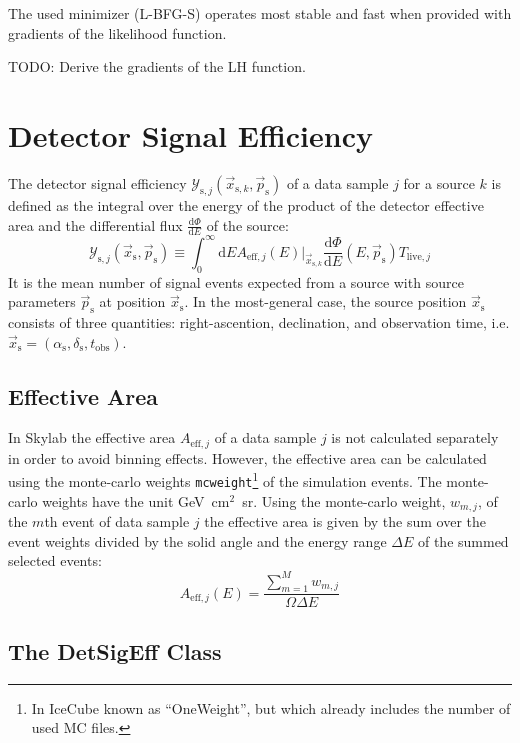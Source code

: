 \documentclass{article}
\newcommand{\code}[1]{\texttt{#1}}
\newcommand{\ps}{\vec{p}_{\mathrm{s}}}
\newcommand{\xs}{\vec{x}_{\mathrm{s}}}
\newcommand{\xsk}{\vec{x}_{\mathrm{s},k}}
\begin{document}
The used minimizer (L-BFG-S) operates most stable and fast when provided with
gradients of the likelihood function.

TODO: Derive the gradients of the LH function.

\section{Detector Signal Efficiency}

The detector signal efficiency $\mathcal{Y}_{\mathrm{s},j}(\vec{x}_{\mathrm{s},k},\ps)$
of a data sample $j$ for a source $k$ is defined as the integral over the energy
of the product of the detector effective area and the differential flux
$\frac{\mathrm{d}\Phi}{\mathrm{d}E}$ of the source:
\begin{equation}
 \mathcal{Y}_{\mathrm{s},j}(\xs,\ps) \equiv \int_0^\infty \mathrm{d}E A_{\mathrm{eff},j}(E)|_{\xsk} \frac{\mathrm{d}\Phi}{\mathrm{d}E}(E,\ps) T_{\mathrm{live},j}
\label{eq:Ysj}
\end{equation}
It is the mean number of signal events expected from a source with source
parameters $\ps$ at position $\xs$. In the most-general case, the source position $\xs$
consists of three quantities: right-ascention, declination, and observation time,
i.e. $\xs = (\alpha_{\mathrm{s}},\delta_{\mathrm{s}},t_{\mathrm{obs}})$.

\subsection{Effective Area}

In Skylab the effective area $A_{\mathrm{eff},j}$ of a data sample $j$ is not
calculated separately in order to avoid binning effects. However, the effective
area can be calculated using the monte-carlo weights \code{mcweight}\footnote{In IceCube
known as ``OneWeight'', but which already includes the number of used MC files.}
of the simulation events.
The monte-carlo weights have the unit GeV~cm$^2$~sr.
Using the monte-carlo weight, $w_{m,j}$, of the $m$th event of data sample $j$
the effective area is given by the sum over the event weights divided by the
solid angle and the energy range $\Delta E$ of the summed selected events:
\begin{equation}
 A_{\mathrm{eff},j}(E) = \frac{\sum_{m=1}^{M} w_{m,j}}{\Omega \Delta E}
\end{equation}


\subsection{The DetSigEff Class}
\end{document}
